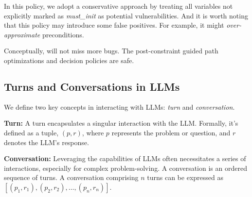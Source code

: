 
In this policy, we adopt a conservative approach by treating all variables not explicitly marked as \textit{must\_init} as potential vulnerabilities.
And it is worth noting that this policy may introduce some false positives. For example, it might \textit{over-approximate} preconditions.



Conceptually, \work will not miss more bugs. The post-constraint guided path optimizations and decision policies are safe.



\subsection{Turns and Conversations in LLMs}
\label{subsec:turn_convo}


We define two key concepts in interacting with LLMs: \textit{turn} and \textit{conversation}.

\squishlist
    \item \textbf{Turn:} A turn encapsulates a singular interaction with the LLM. Formally, it's defined as a tuple, $(p, r)$, where $p$ represents the problem or question, 
    and $r$ denotes the LLM's response.

    \item \textbf{Conversation:} Leveraging the capabilities of LLMs often necessitates a series of interactions, especially for complex problem-solving. A conversation is an ordered sequence of turns. A conversation comprising $n$ turns can be expressed as $[(p_1, r_1), (p_2, r_2), \ldots , (p_n, r_n)]$.
\squishend

